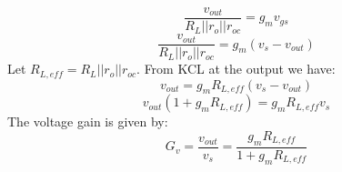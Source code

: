     \begin{equation}
        \frac{{{v_{out}}}}{{{R_L}||{r_o}||r_{oc}}} = {g_m}{v_{gs}}
    \end{equation}
    \begin{equation}
        \frac{{{v_{out}}}}{{{R_L}||{r_o}||r_{oc}}} = {g_m}\left( {{v_{s}} - {v_{out}}} \right)
    \end{equation}
Let $R_{L,eff} =  R_L || r_o || r_{oc}$.   From KCL at the output we have:
    \begin{equation}
        v_{out} = g_m R_{L,eff} (v_s - v_{out} )
    \end{equation}
    \begin{equation}
        v_{out} \left(1 + g_m R_{L,eff} \right) = g_m R_{L,eff} v_s
    \end{equation}
The voltage gain is given by:
    \begin{equation}
        G_v = \frac{v_{out}}{v_s} = \frac{ g_m R_{L,eff}}{ 1 + g_m R_{L,eff}}
    \end{equation}
\newpage
